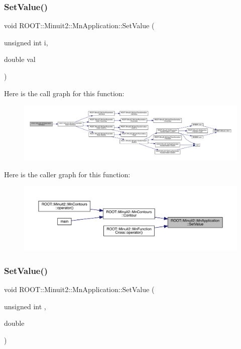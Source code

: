 \subsubsection{\texorpdfstring{SetValue()}{SetValue()}\hspace{0.1cm}{\footnotesize\ttfamily [1/4]}}
{\footnotesize\ttfamily void R\+O\+O\+T\+::\+Minuit2\+::\+Mn\+Application\+::\+Set\+Value (\begin{DoxyParamCaption}\item[{unsigned int}]{i,  }\item[{double}]{val }\end{DoxyParamCaption})}

Here is the call graph for this function\+:\nopagebreak
\begin{figure}[H]
\begin{center}
\leavevmode
\includegraphics[width=350pt]{df/dd5/classROOT_1_1Minuit2_1_1MnApplication_af6147ded182dfe93c2200d621050c642_cgraph}
\end{center}
\end{figure}
Here is the caller graph for this function\+:\nopagebreak
\begin{figure}[H]
\begin{center}
\leavevmode
\includegraphics[width=350pt]{df/dd5/classROOT_1_1Minuit2_1_1MnApplication_af6147ded182dfe93c2200d621050c642_icgraph}
\end{center}
\end{figure}
\mbox{\label{classROOT_1_1Minuit2_1_1MnApplication_af6147ded182dfe93c2200d621050c642}} 
\subsubsection{\texorpdfstring{SetValue()}{SetValue()}\hspace{0.1cm}{\footnotesize\ttfamily [2/4]}}
{\footnotesize\ttfamily void R\+O\+O\+T\+::\+Minuit2\+::\+Mn\+Application\+::\+Set\+Value (\begin{DoxyParamCaption}\item[{unsigned int}]{,  }\item[{double}]{ }\end{DoxyParamCaption})}

